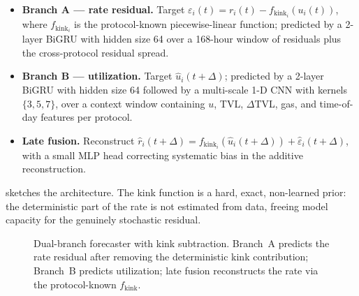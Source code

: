\documentclass[11pt,a4paper]{article}
\begin{document}
\begin{itemize}[leftmargin=*, itemsep=2pt]
\item \textbf{Branch A --- rate residual.} Target
  $\varepsilon_i(t)=r_i(t)-f_{\text{kink}_i}(u_i(t))$, where
  $f_{\text{kink}_i}$ is the protocol-known piecewise-linear function;
  predicted by a 2-layer BiGRU with hidden size 64 over a 168-hour
  window of residuals plus the cross-protocol residual spread.
\item \textbf{Branch B --- utilization.} Target $\hat u_i(t+\Delta)$;
  predicted by a 2-layer BiGRU with hidden size 64 followed by a
  multi-scale 1-D CNN with kernels $\{3,5,7\}$, over a context window
  containing $u$, TVL, $\Delta$TVL, gas, and time-of-day features per
  protocol.
\item \textbf{Late fusion.} Reconstruct
  $\hat r_i(t+\Delta)=f_{\text{kink}_i}(\hat u_i(t+\Delta))+
  \hat\varepsilon_i(t+\Delta)$, with a small MLP head correcting
  systematic bias in the additive reconstruction.
\end{itemize}

 sketches the architecture. The kink function is a
hard, exact, non-learned prior: the deterministic part of the rate is
not estimated from data, freeing model capacity for the genuinely
stochastic residual.

\begin{figure}[t]
\centering
{}
\caption{Dual-branch forecaster with kink subtraction. Branch~A
predicts the rate residual after removing the deterministic kink
contribution; Branch~B predicts utilization; late fusion reconstructs
the rate via the protocol-known $f_{\text{kink}}$.}
\label{fig:arch}
\end{figure}
\end{document}
